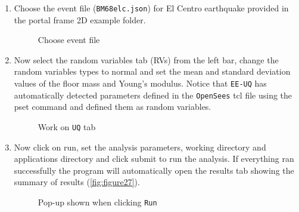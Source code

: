 \begin{enumerate}
\item Choose the event file (\texttt{BM68elc.json}) for El Centro earthquake provided in the portal frame 2D example folder.
\begin{figure}[!htbp]
  \caption{Choose event file}
  \label{fig:figure25}
\end{figure}

\item Now select the random variables tab (RVs) from the left bar, change the random variables types to normal and set the mean and standard deviation values of the floor mass and
Young’s modulus.  Notice that \texttt{EE-UQ} has automatically
detected parameters defined in the \texttt{OpenSees} tcl file using the pset
command and defined them as random variables.
\begin{figure}[!htbp]
  \caption{Work on \texttt{UQ} tab}
  \label{fig:figure26}
\end{figure}

\item Now click on run, set the analysis parameters, working directory and applications directory and click submit to run the analysis. 
If everything ran successfully the program will automatically open the
results tab showing the summary of results (\autoref{fig:figure27}).
\begin{figure}[!htbp]
    \caption{Pop-up shown when clicking \texttt{Run}}
    \label{fig:figure27}
\end{figure}

\end{enumerate}



